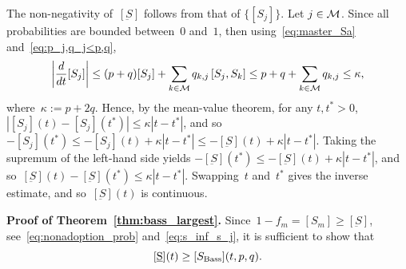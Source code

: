 \documentclass[review]{elsarticle}
\begin{document}
\begin{pf}
	The non-negativity of~$[\underbar{S}]$ follows from that of $\{[S_j]\}$. 
	Let $j \in {\cal M}$.
	Since all probabilities are bounded between~$0$ and~$1$, then using~\eqref{eq:master_Sa} and~\eqref{eq:p_j,q_j<p,q},
	\begin{equation*}
		\left|\frac{d}{dt}[S_j]\right| \leq (p+q)[S_j]+\sum_{k\in \cal M}q_{k,j}\left[S_j,S_k\right]\leq p+q+\sum_{k\in \cal M}q_{k,j} \le  \kappa, 
	\end{equation*}
	where~$\kappa:=p+2q$.
	Hence, by the mean-value theorem, for any $t,t^*>0$, $\left|[S_j](t) - [S_j]\left(t^*\right)\right|\leq \kappa\left|t-t^*\right|$, and so~$- [S_j]\left(t^*\right)\leq -[S_j](t)+\kappa\left|t-t^*\right|\leq -[\underbar{S}](t)+\kappa\left|t-t^*\right|$. Taking the supremum of the left-hand side yields $ -[\underbar{S}]\left(t^*\right)\leq -[\underbar{S}](t)+\kappa\left|t-t^*\right|$, and so~$[\underbar{S}](t) -[\underbar{S}]\left(t^*\right)\leq \kappa\left|t-t^*\right|$. Swapping~$t$ and~$t^*$ gives the inverse estimate, and so~$[\underbar{S}](t)$ is continuous.
\end{pf}

{\bf Proof of Theorem~\ref{thm:bass_largest}. }
Since~$1-f_m = [S_m]\geq [\underbar{S}]$, 
see~\eqref{eq:nonadoption_prob} and~\eqref{eq:s_inf_s_j}, 	
	it is sufficient to show that
	\begin{equation}
		\label{eq:s_bass<s_inf}
		[\underbar{S}](t) \geq [S_{\rm Bass}](t,p,q).
	\end{equation}
	
\end{document}
